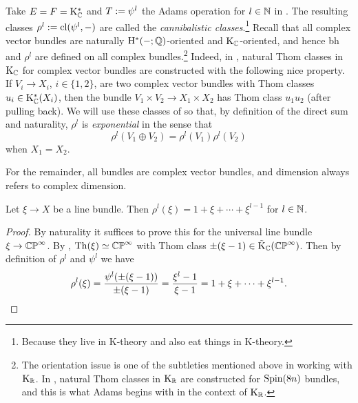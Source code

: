 \begin{definitions}
  Take $E = F = \mathrm{K}_{\mathbb{C}}^*$ and $T \mathrel{:=} \psi^l$ the Adams operation for $l
  \in \mathbb{N}$ in . The resulting classes $\rho^l \mathrel{:=}
  \mathrm{cl}(\psi^l,-)$ are called the \emph{cannibalistic
    classes}.\footnote{Because they live in K-theory and also eat
    things in K-theory.}
  Recall that all complex vector bundles are naturally
  $\mathrm{H}^*(-;\mathbb{Q})$-oriented and $\mathrm{K}_{\mathbb{C}}$-oriented, and hence bh and
  $\rho^l$ are defined on all complex bundles.\footnote{The
    orientation issue is one of the subtleties mentioned above in
    working with $\mathrm{K}_{\mathbb{R}}$. In \cite{abs-clifford}, natural Thom classes
    in $\mathrm{K}_{\mathbb{R}}$ are constructed for $\operatorname{Spin}(8n)$ bundles, and this is
    what Adams begins with in the context of $\mathrm{K}_{\mathbb{R}}$.} Indeed, in
  \cite{abs-clifford}, natural Thom classes in $\mathrm{K}_{\mathbb{C}}$ for complex
  vector bundles are constructed with the following nice property. If
  $V_i \to X_i$, $i \in \{1,2\}$, are two complex vector bundles with
  Thom classes $u_i \in \mathrm{K}_{\mathbb{C}}^*(X_i)$, then the bundle $V_1 \times V_2
  \to X_1 \times X_2$ has Thom class $u_1u_2$ (after pulling back). We
  will use these classes of \cite{abs-clifford} so that, by definition
  of the direct sum and naturality, $\rho^l$ is \emph{exponential} in
  the sense that
  \begin{equation}
    \label{exponential}
    \rho^l(V_1 \oplus V_2) = \rho^l(V_1)\rho^l(V_2)
  \end{equation}
  when $X_1 = X_2$.
\end{definitions}

\begin{convention}
  \label{complex-convention}
  For the remainder, all bundles are complex vector bundles, and
  dimension always refers to complex dimension.
\end{convention}

\begin{lemma}
  \label{cannibal-line}
  Let $\xi \to X$ be a line bundle. Then $\rho^l(\xi) = 1 + \xi +
  \cdots + \xi^{l-1}$ for $l \in \mathbb{N}$.
\end{lemma}

\begin{proof}
  By naturality it suffices to prove this for the universal line
  bundle $\xi \to \mathbb{CP}^{\infty}$. By , $\operatorname{Th}(\xi) \simeq
  \mathbb{CP}^\infty$ with Thom class $\pm(\xi - 1) \in
  \tilde{\mathrm{K}}_{\mathbb{C}}(\mathbb{CP}^\infty)$. Then by definition of $\rho^l$ and
  $\psi^l$ we have
  \[
  \rho^l(\xi) = \frac{\psi^l(\pm(\xi-1))}{\pm(\xi-1)} = \frac{\xi^l -
    1}{\xi - 1} = 1 + \xi + \cdots + \xi^{l-1}. \qedhere
  \]
\end{proof}

